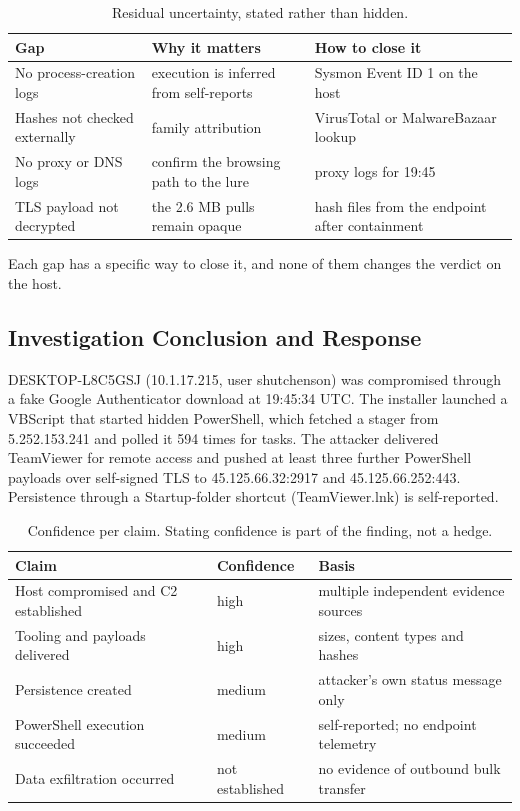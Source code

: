 \begin{table}[htbp]
  \centering
  \caption{Residual uncertainty, stated rather than hidden.}
  \label{tab:gaps}
  \footnotesize
  \begin{tabularx}{\linewidth}{@{}YYY@{}}
    \toprule
    \textbf{Gap} & \textbf{Why it matters} & \textbf{How to close it} \\
    \midrule
    No process-creation logs & execution is inferred from self-reports & Sysmon Event ID 1 on the host \\
    Hashes not checked externally & family attribution & VirusTotal or MalwareBazaar lookup \\
    No proxy or DNS logs & confirm the browsing path to the lure & proxy logs for 19:45 \\
    TLS payload not decrypted & the 2.6 MB pulls remain opaque & hash files from the endpoint after containment \\
    \bottomrule
  \end{tabularx}
\end{table}

Each gap has a specific way to close it, and none of them changes the verdict on the host.

\subsection{Investigation Conclusion and Response}

DESKTOP-L8C5GSJ (10.1.17.215, user shutchenson) was compromised through a fake Google Authenticator download at 19:45:34 UTC. The installer launched a VBScript that started hidden PowerShell, which fetched a stager from 5.252.153.241 and polled it 594 times for tasks. The attacker delivered TeamViewer for remote access and pushed at least three further PowerShell payloads over self-signed TLS to 45.125.66.32:2917 and 45.125.66.252:443. Persistence through a Startup-folder shortcut (TeamViewer.lnk) is self-reported.

\begin{table}[htbp]
  \centering
  \caption{Confidence per claim. Stating confidence is part of the finding, not a hedge.}
  \label{tab:confidence}
  \footnotesize
  \begin{tabularx}{\linewidth}{@{}YlY@{}}
    \toprule
    \textbf{Claim} & \textbf{Confidence} & \textbf{Basis} \\
    \midrule
    Host compromised and C2 established & high & multiple independent evidence sources \\
    Tooling and payloads delivered & high & sizes, content types and hashes \\
    Persistence created & medium & attacker's own status message only \\
    PowerShell execution succeeded & medium & self-reported; no endpoint telemetry \\
    Data exfiltration occurred & not established & no evidence of outbound bulk transfer \\
    \bottomrule
  \end{tabularx}
\end{table}


